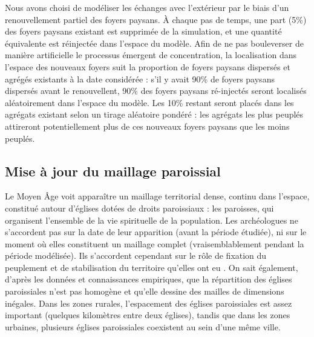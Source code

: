 \begin{tcolorbox}[breakable,left=0pt,right=0pt,top=0pt,bottom=0pt,
	colback=gray!15,colframe=gray!15,width=\dimexpr\textwidth\relax, 
	enlarge left by=0mm, boxsep=5pt,arc=0pt,outer arc=0pt]
Nous avons choisi de modéliser les échanges avec l'extérieur par le biais d'un renouvellement partiel des foyers paysans.
À chaque pas de temps, une part (5\%) des foyers paysans existant est supprimée de la simulation, et une quantité équivalente est réinjectée dans l'espace du modèle.
Afin de ne pas bouleverser de manière artificielle le processus émergent de concentration, la localisation dans l'espace des nouveaux foyers suit la proportion de foyers paysans dispersés et agrégés existants à la date considérée :
s'il y avait 90\% de foyers paysans dispersés avant le renouvellent, 90\% des foyers paysans ré-injectés seront localisés aléatoirement dans l'espace du modèle.
Les 10\% restant seront placés dans les agrégats existant selon un tirage aléatoire pondéré : les agrégats les plus peuplés attireront potentiellement plus de ces nouveaux foyers paysans que les moins peuplés\footnotemark.

\end{tcolorbox}

\subsection{Mise à jour du maillage paroissial \label{meca-paroisses}}

Le Moyen Âge voit apparaître un maillage territorial dense, continu dans l'espace, constitué autour d'églises dotées de droits paroissiaux : les paroisses, qui organisent l'ensemble de la vie spirituelle de la population.
Les archéologues ne s'accordent pas sur la date de leur apparition (avant la période étudiée), ni sur le moment où elles constituent un maillage complet (vraisemblablement pendant la période modélisée).
Ils s'accordent cependant sur le rôle de fixation du peuplement et de stabilisation du territoire qu'elles ont eu \autocite{zadora-rio_paroisses_2008}.
On sait également, d'après les données et connaissances empiriques, que la répartition des églises paroissiales n'est pas homogène et qu'elle dessine des mailles de dimensions inégales.
Dans les zones rurales, l'espacement des églises paroissiales est assez important (quelques kilomètres entre deux églises), tandis que dans les zones urbaines, plusieurs églises paroissiales coexistent au sein d'une même ville.	

